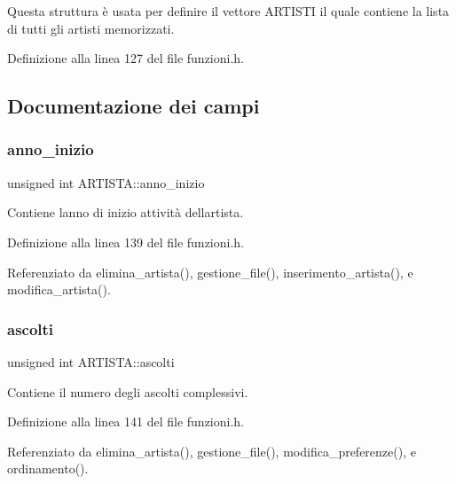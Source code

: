 Questa struttura è usata per definire il vettore A\+R\+T\+I\+S\+TI il quale contiene la lista di tutti gli artisti memorizzati. 

Definizione alla linea 127 del file funzioni.\+h.



\subsection{Documentazione dei campi}
\mbox{\label{struct_a_r_t_i_s_t_a_a776bd83463cbbd70affcbc08b7687675}} 
\subsubsection{\texorpdfstring{anno\+\_\+inizio}{anno\_inizio}}
{\footnotesize\ttfamily unsigned int A\+R\+T\+I\+S\+T\+A\+::anno\+\_\+inizio}

Contiene l\textquotesingle{}anno di inizio attività dell\textquotesingle{}artista. 

Definizione alla linea 139 del file funzioni.\+h.



Referenziato da elimina\+\_\+artista(), gestione\+\_\+file(), inserimento\+\_\+artista(), e modifica\+\_\+artista().

\mbox{\label{struct_a_r_t_i_s_t_a_a94634853ac282b23729897e105865590}} 
\subsubsection{\texorpdfstring{ascolti}{ascolti}}
{\footnotesize\ttfamily unsigned int A\+R\+T\+I\+S\+T\+A\+::ascolti}

Contiene il numero degli ascolti complessivi. 

Definizione alla linea 141 del file funzioni.\+h.



Referenziato da elimina\+\_\+artista(), gestione\+\_\+file(), modifica\+\_\+preferenze(), e ordinamento().

\mbox{\label{struct_a_r_t_i_s_t_a_a614effe8a3285fd1b6bd29e7bff7ff72}} 
